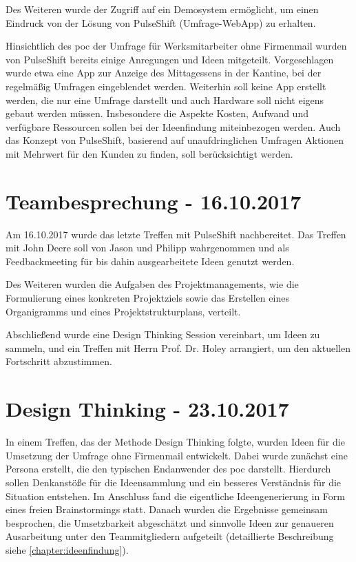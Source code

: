 Des Weiteren wurde der Zugriff auf ein Demosystem ermöglicht, um einen Eindruck von der Lösung von PulseShift (Umfrage-WebApp) zu erhalten.

Hinsichtlich des \gls{poc} der Umfrage für Werksmitarbeiter ohne Firmenmail wurden von PulseShift bereits einige Anregungen und Ideen mitgeteilt. Vorgeschlagen wurde etwa eine App zur Anzeige des Mittagessens in der Kantine, bei der regelmäßig Umfragen eingeblendet werden. Weiterhin soll keine App erstellt werden, die nur eine Umfrage darstellt und auch Hardware soll nicht eigens gebaut werden müssen. Insbesondere die Aspekte Kosten, Aufwand und verfügbare Ressourcen sollen bei der Ideenfindung miteinbezogen werden. Auch das Konzept von PulseShift, basierend auf unaufdringlichen Umfragen Aktionen mit Mehrwert für den Kunden zu finden, soll berücksichtigt werden.

\section{Teambesprechung - 16.10.2017}
Am 16.10.2017 wurde das letzte Treffen mit PulseShift nachbereitet. Das Treffen mit John Deere soll von Jason und Philipp wahrgenommen und als Feedbackmeeting für bis dahin ausgearbeitete Ideen genutzt werden.

Des Weiteren wurden die Aufgaben des Projektmanagements, wie die Formulierung eines konkreten Projektziels sowie das Erstellen eines Organigramms und eines Projektstrukturplans, verteilt.

Abschließend wurde eine Design Thinking Session vereinbart, um Ideen zu sammeln, und ein Treffen mit Herrn Prof. Dr. Holey arrangiert, um den aktuellen Fortschritt abzustimmen.

\section{Design Thinking - 23.10.2017}
In einem Treffen, das der Methode Design Thinking folgte, wurden Ideen für die Umsetzung der Umfrage ohne Firmenmail entwickelt. Dabei wurde zunächst eine Persona erstellt, die den typischen Endanwender des \gls{poc} darstellt. Hierdurch sollen Denkanstöße für die Ideensammlung und ein besseres Verständnis für die Situation entstehen. Im Anschluss fand die eigentliche Ideengenerierung in Form eines freien Brainstormings statt. Danach wurden die Ergebnisse gemeinsam besprochen, die Umsetzbarkeit abgeschätzt und sinnvolle Ideen zur genaueren Ausarbeitung unter den Teammitgliedern aufgeteilt (detaillierte Beschreibung siehe \vref{chapter:ideenfindung}).

